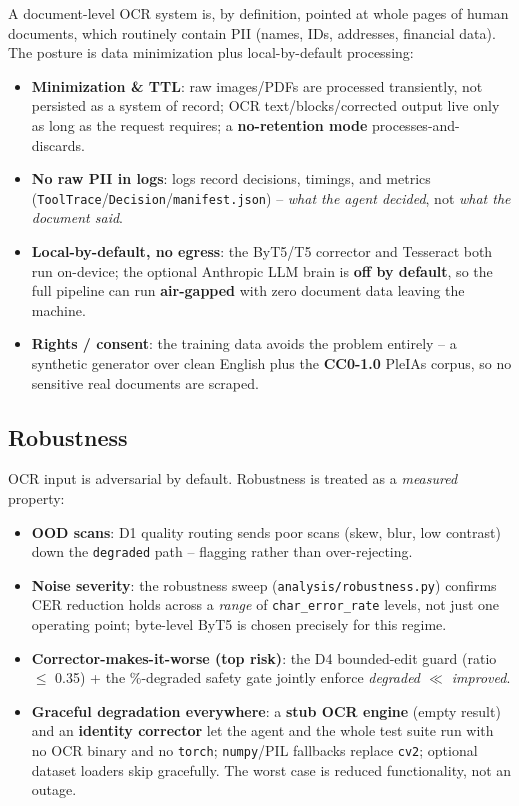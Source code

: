 \documentclass[12pt,a4paper]{article}
\begin{document}
A document-level OCR system is, by definition, pointed at whole pages of human documents, which routinely contain PII (names, IDs, addresses, financial data). The posture is data minimization plus local-by-default processing:
\begin{itemize}\setlength\itemsep{0.15em}
  \item \textbf{Minimization \& TTL}: raw images/PDFs are processed transiently, not persisted as a system of record; OCR text/blocks/corrected output live only as long as the request requires; a \textbf{no-retention mode} processes-and-discards.
  \item \textbf{No raw PII in logs}: logs record decisions, timings, and metrics (\texttt{ToolTrace}/\texttt{Decision}/\texttt{manifest.json}) -- \emph{what the agent decided}, not \emph{what the document said}.
  \item \textbf{Local-by-default, no egress}: the ByT5/T5 corrector and Tesseract both run on-device; the optional Anthropic LLM brain is \textbf{off by default}, so the full pipeline can run \textbf{air-gapped} with zero document data leaving the machine.
  \item \textbf{Rights / consent}: the training data avoids the problem entirely -- a synthetic generator over clean English plus the \textbf{CC0-1.0} PleIAs corpus, so no sensitive real documents are scraped.
\end{itemize}

\subsection{Robustness}

OCR input is adversarial by default. Robustness is treated as a \emph{measured} property:
\begin{itemize}\setlength\itemsep{0.15em}
  \item \textbf{OOD scans}: D1 quality routing sends poor scans (skew, blur, low contrast) down the \texttt{degraded} path -- flagging rather than over-rejecting.
  \item \textbf{Noise severity}: the robustness sweep (\texttt{analysis/robustness.py}) confirms CER reduction holds across a \emph{range} of \texttt{char\_error\_rate} levels, not just one operating point; byte-level ByT5 is chosen precisely for this regime.
  \item \textbf{Corrector-makes-it-worse (top risk)}: the D4 bounded-edit guard (ratio $\le$ 0.35) + the \%-degraded safety gate jointly enforce \emph{degraded $\ll$ improved}.
  \item \textbf{Graceful degradation everywhere}: a \textbf{stub OCR engine} (empty result) and an \textbf{identity corrector} let the agent and the whole test suite run with no OCR binary and no \texttt{torch}; \texttt{numpy}/PIL fallbacks replace \texttt{cv2}; optional dataset loaders skip gracefully. The worst case is reduced functionality, not an outage.
\end{itemize}
\end{document}
